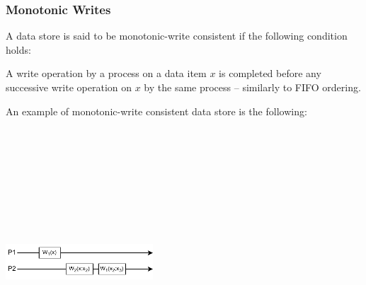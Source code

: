 \documentclass{article}
\begin{document}
\subsubsection{Monotonic Writes}
A data store is said to be monotonic-write consistent if the following condition holds:
\begin{changemargin}{0.4cm}{0cm} 
A write operation by a process on a data item $x$ is completed before any successive write operation on $x$ by the same process -- similarly to FIFO ordering.
\end{changemargin}
An example of monotonic-write consistent data store is the following:
\begin{center}
	\includegraphics[width=5.5cm, height=10cm, keepaspectratio]{assets/monotonic-writes.pdf}
\end{center}
\end{document}
